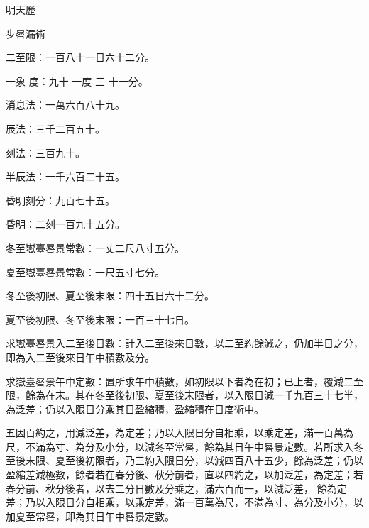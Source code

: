 
\begin{pinyinscope}

 明天歷



 步晷漏術



 二至限：一百八十一日六十二分。



 一象
 度：九十
 一度
 三
 十一分。



 消息法：一萬六百八十九。



 辰法：三千二百五十。



 刻法：三百九十。



 半辰法：一千六百二十五。



 昏明刻分：九百七十五。



 昏明：二刻一百九十五分。



 冬至嶽臺晷景常數：一丈二尺八寸五分。



 夏至嶽臺晷景常數：一尺五寸七分。



 冬至後初限、夏至後末限：四十五日六十二分。



 夏至後初限、冬至後末限：一百三十七日。



 求嶽臺晷景入二至後日數：計入二至後來日數，以二至約餘減之，仍加半日之分，即為入二至後來日午中積數及分。



 求嶽臺晷景午中定數：置所求午中積數，如初限以下者為在初；已上者，覆減二至限，餘為在末。其在冬至後初限、夏至後末限者，以入限日減一千九百三十七半，
 為泛差；仍以入限日分乘其日盈縮積，盈縮積在日度術中。



 五因百約之，用減泛差，為定差；乃以入限日分自相乘，以乘定差，滿一百萬為尺，不滿為寸、為分及小分，以減冬至常晷，餘為其日午中晷景定數。若所求入冬至後末限、夏至後初限者，乃三約入限日分，以減四百八十五少，餘為泛差；仍以盈縮差減極數，餘者若在春分後、秋分前者，直以四約之，以加泛差，為定差；若春分前、秋分後者，以去二分日數及分乘之，滿六百而一，以減泛差，
 餘為定差；乃以入限日分自相乘，以乘定差，滿一百萬為尺，不滿為寸、為分及小分，以加夏至常晷，即為其日午中晷景定數。




\end{pinyinscope}
